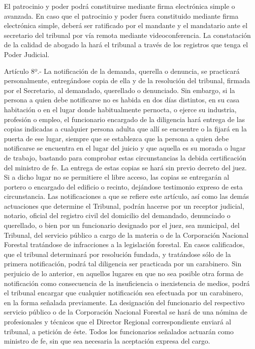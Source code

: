     El patrocinio y poder podrá constituirse mediante firma electrónica simple o avanzada. En caso que el patrocinio y poder fuera constituido mediante firma electrónica simple, deberá ser ratificado por el mandante y el mandatario ante el secretario del tribunal por vía remota mediante videoconferencia. La constatación de la calidad de abogado la hará el tribunal a través de los registros que tenga el Poder Judicial.

    Artículo 8º.- La notificación de la demanda, querella o denuncia, se practicará personalmente, entregándose copia de ella y de la resolución del tribunal, firmada por el Secretario, al demandado, querellado o denunciado.
    Sin embargo, si la persona a quien debe notificarse no es habida en dos días distintos, en su casa habitación o en el lugar donde habitualmente pernocta, o ejerce su industria, profesión o empleo, el funcionario encargado de la diligencia hará entrega de las copias indicadas a cualquier persona adulta que allí se encuentre o la fijará en la puerta de ese lugar, siempre que se establezca que la persona a quien debe notificarse se encuentra en el lugar del juicio y que aquella es su morada o lugar de trabajo, bastando para comprobar estas circunstancias la debida certificación del ministro de fe. La entrega de estas copias se hará sin previo decreto del juez. Si a dicho lugar no se permitiere el libre acceso, las copias se entregarán al portero o encargado del edificio o recinto, dejándose testimonio expreso de esta circunstancia.
    Las notificaciones a que se refiere este artículo, así como las demás actuaciones que determine el Tribunal, podrán hacerse por un receptor judicial, notario, oficial del registro civil del domicilio del demandado, denunciado o querellado, o bien por un funcionario designado por el juez, sea municipal, del Tribunal, del servicio público a cargo de la materia o de la Corporación Nacional Forestal tratándose de infracciones a la legislación forestal. En casos calificados, que el tribunal determinará por resolución fundada, y tratándose sólo de la primera notificación, podrá tal diligencia ser practicada por un carabinero. Sin perjuicio de lo anterior, en aquellos lugares en que no sea posible otra forma de notificación como consecuencia de la insuficiencia o inexistencia de medios, podrá el tribunal encargar que cualquier notificación sea efectuada por un carabinero, en la forma señalada previamente. La designación del funcionario del respectivo servicio público o de la Corporación Nacional Forestal se hará de una nómina de profesionales y técnicos que el Director Regional correspondiente enviará al tribunal, a petición de éste. Todos los funcionarios señalados actuarán como ministro de fe, sin que sea necesaria la aceptación expresa del cargo.
